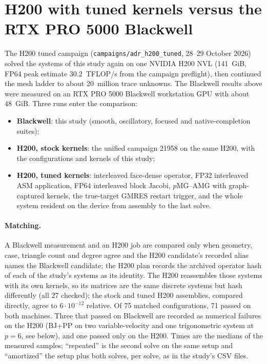 \section{H200 with tuned kernels versus the RTX PRO 5000 Blackwell}
\label{sec:adr-h200-tuned}

The H200 tuned campaign (\texttt{campaigns/adr\_h200\_tuned}, 28--29 October 2026) solved the
systems of this study again on one NVIDIA H200 NVL (141~GiB, FP64 peak estimate 30.2~TFLOP/s from
the campaign preflight), then continued the mesh ladder to about 20~million trace unknowns. The
Blackwell results above were measured on an RTX PRO 5000 Blackwell workstation GPU with about
48~GiB. Three runs enter the comparison:
\begin{itemize}
\item \textbf{Blackwell}: this study (smooth, oscillatory, focused and native-completion suites);
\item \textbf{H200, stock kernels}: the unified campaign 21958 on the same H200, with the
  configurations and kernels of this study;
\item \textbf{H200, tuned kernels}: interleaved face-dense operator, FP32 interleaved ASM
  application, FP64 interleaved block Jacobi, $p$MG--AMG with graph-captured kernels, the
  true-target GMRES restart trigger, and the whole system resident on the device from assembly
  to the last solve.
\end{itemize}

\paragraph{Matching.} A Blackwell measurement and an H200 job are compared only when geometry,
case, triangle count and degree agree and the H200 candidate's recorded alias names the
Blackwell candidate; the H200 plan records the archived operator hash of each of the study's
systems as its identity. The H200 reassembles those systems with its own kernels, so its
matrices are the same discrete systems but hash differently (all 27 checked); the stock and tuned
H200 assemblies, compared directly, agree to $6\cdot10^{-12}$ relative.
Of 75 matched configurations, 71 passed on both machines. Three that passed on Blackwell are
recorded as numerical failures on the H200 (BJ+PP on two variable-velocity and one trigonometric
system at $p=6$, see below), and one passed only on the H200. Times are the medians of the
measured samples; ``repeated'' is the second solve on the same setup and ``amortized'' the setup
plus both solves, per solve, as in the study's CSV files.

